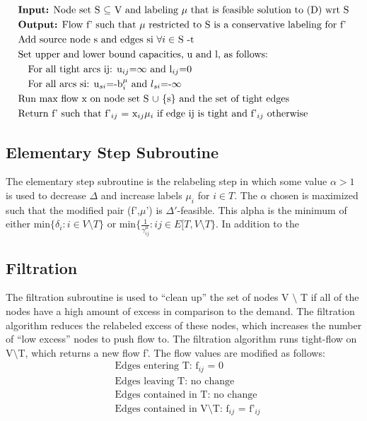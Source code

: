 \documentclass[11pt]{article}
\theoremstyle{definition}
\theoremstyle{definition}
\newcommand{\giij}{\gamma_{ij}^{\mu}}
\begin{document}
\begin{align*}
&\text{\textbf{Input:} Node set S $\subseteq$ V and labeling $\mu$ that is feasible solution to (D) wrt S} \\
&\text{\textbf{Output:} Flow f' such that $\mu$ restricted to S is a conservative labeling for f'} \\
&\text{Add source node s and edges si $\forall i \in$ S -t} \\
&\text{Set upper and lower bound capacities, u and l, as follows: } \\
&\quad \text{For all tight arcs ij: u$_{ij}$=$\infty$ and l$_{ij}$=0} \\
&\quad \text{For all arcs si: u$_{si}$=-b$_i^\mu$ and $l_{si}$=-$\infty$} \\
&\text{Run max flow x on node set S $\cup$ $\{$s$\}$ and the set of tight edges} \\
&\text{Return f' such that f'$_{ij}$ = x$_{ij}\mu_i$ if edge ij is tight and f'$_{ij}$ otherwise}
\end{align*}

\subsection{Elementary Step Subroutine}
The elementary step subroutine is the relabeling step in which some value $\alpha > 1$ is used to decrease $\Delta$ and increase labels $\mu_i$ for $i \in T$. The $\alpha$ chosen is maximized such that the modified pair (f',$\mu$') is $\Delta'$-feasible. This alpha is the minimum of either min$\{\delta_i: i \in V \setminus T \}$ or min$\{\frac{1}{\giij}: ij \in E[T, V\setminus T\}$. In addition to the  

\subsection{Filtration}
The filtration subroutine is used to ``clean up'' the set of nodes V $\setminus$ T if all of the nodes have a high amount of excess in comparison to the demand. The filtration algorithm reduces the relabeled excess of these nodes, which increases the number of ``low excess'' nodes to push flow to. The filtration algorithm runs tight-flow on V$\setminus$T, which returns a new flow f'. The flow values are modified as follows: 
\begin{align*}
&\text{Edges entering T: f$_{ij}$ = 0} \\ 
&\text{Edges leaving T: no change} \\
&\text{Edges contained in T: no change} \\
&\text{Edges contained in V$\setminus$T: f$_{ij}$ = f'$_{ij}$}
\end{align*}
\end{document}
